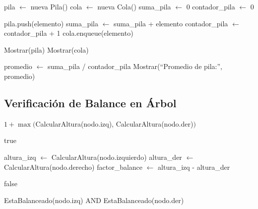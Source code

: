 \documentclass[12pt,a4paper]{article}
\begin{document}
\begin{algorithm}[H]
\caption{Procesar Lista en Pila y Cola}
\begin{algorithmic}
    \State pila $\leftarrow$ nueva Pila()
    \State cola $\leftarrow$ nueva Cola()
    \State suma\_pila $\leftarrow$ 0
    \State contador\_pila $\leftarrow$ 0
    
         
            \State pila.push(elemento)
            \State suma\_pila $\leftarrow$ suma\_pila + elemento
            \State contador\_pila $\leftarrow$ contador\_pila + 1
        \Else {}
            \State cola.enqueue(elemento)
        \EndIf
    \EndFor
    
    \State Mostrar(pila)
    \State Mostrar(cola)
    
        \State promedio $\leftarrow$ suma\_pila / contador\_pila
        \State Mostrar(``Promedio de pila:'', promedio)
    \EndIf
\EndProcedure
\end{algorithmic}
\end{algorithm}

\subsection{Verificación de Balance en Árbol}

\begin{algorithm}[H]
\caption{Verificar si un árbol está balanceado}
\begin{algorithmic}
        \State {}
    \EndIf
    \State \Return $1 + \max($CalcularAltura(nodo.izq), CalcularAltura(nodo.der)$)$
\EndProcedure

        \State \Return true
    \EndIf
    
    \State altura\_izq $\leftarrow$ CalcularAltura(nodo.izquierdo)
    \State altura\_der $\leftarrow$ CalcularAltura(nodo.derecho)
    \State factor\_balance $\leftarrow$ altura\_izq - altura\_der
    
        \State \Return false
    \EndIf
    
    \State \Return EstaBalanceado(nodo.izq) AND EstaBalanceado(nodo.der)
\EndProcedure
\end{algorithmic}
\end{algorithm}
\end{document}
